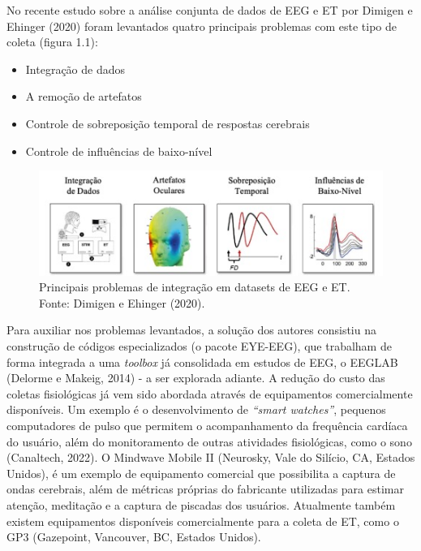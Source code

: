 \documentclass[a4paper, 12pt]{ppgeb}
\begin{document}
No recente estudo sobre a análise conjunta de dados de EEG e ET por Dimigen e Ehinger (2020) foram levantados
 quatro principais problemas com este tipo de coleta (figura 1.1):


\begin{itemize}
    \item Integração de dados
    \item A remoção de artefatos
    \item Controle de sobreposição temporal de respostas cerebrais
    \item Controle de influências de baixo-nível
\end{itemize}

\begin{figure}[h]
    \centering
    \includegraphics[width=130mm]{problemas_eeget.jpg}
    \caption[Exemplo de um acelerador linear utilizado no Hospital Universitário de Brasília.]
    {Principais problemas de integração em datasets de EEG e ET. Fonte: Dimigen e
    Ehinger (2020).}\label{fig:acelerador}
    \end{figure}

Para auxiliar nos problemas levantados, a solução dos autores consistiu na construção de códigos especializados (o pacote EYE-EEG),
que trabalham de forma integrada a uma \textit{toolbox} já consolidada em estudos de EEG, o EEGLAB (Delorme e Makeig, 2014) - a ser explorada adiante. A redução do custo das coletas fisiológicas já vem sido abordada através de equipamentos comercialmente disponíveis. 
Um exemplo é o desenvolvimento de \textit{“smart watches”}, pequenos computadores de pulso que permitem o acompanhamento da
frequência cardíaca do usuário, além do monitoramento de outras atividades fisiológicas, como o sono (Canaltech, 2022).
O Mindwave Mobile II (Neurosky, Vale do Silício, CA, Estados Unidos), é um exemplo de equipamento comercial que possibilita a captura de ondas cerebrais, além de métricas 
próprias do fabricante utilizadas para estimar atenção, meditação e a captura de piscadas dos usuários. Atualmente também 
existem equipamentos disponíveis comercialmente para a coleta de ET, como o GP3 (Gazepoint, Vancouver, BC, Estados Unidos). 
\end{document}
